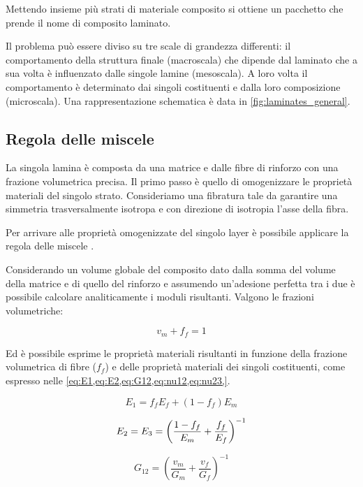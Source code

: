 \documentclass[a4paper,num-refs]{oup-contemporary}
\begin{document}
Mettendo insieme più strati di materiale composito si ottiene un pacchetto che prende il nome di composito laminato.

Il problema può essere diviso su tre scale di grandezza differenti: il comportamento della struttura finale (macroscala) che dipende dal laminato che a sua volta è influenzato dalle singole lamine (mesoscala). A loro volta il comportamento è determinato dai singoli costituenti e dalla loro composizione (microscala). Una rappresentazione schematica è data in \cref{fig:laminates_general}.


\subsection{Regola delle miscele}

La singola lamina è composta da una matrice e dalle fibre di rinforzo con una frazione volumetrica precisa. Il primo passo è quello di omogenizzare le proprietà materiali del singolo strato. Consideriamo una fibratura tale da garantire una simmetria trasversalmente isotropa e con direzione di isotropia l'asse della fibra. 

Per arrivare alle proprietà omogenizzate del singolo layer è possibile applicare la regola delle miscele \citep{Kollar:1}.

Considerando un volume globale del composito dato dalla somma del volume della matrice e di quello del rinforzo e assumendo un'adesione perfetta tra i due è possibile calcolare analiticamente i moduli risultanti. Valgono le frazioni volumetriche:

\begin{equation}
v_m+f_f=1   
\end{equation}

Ed è possibile esprime le proprietà materiali risultanti in funzione della frazione volumetrica di fibre ($f_f$) e delle proprietà materiali dei singoli costituenti, come espresso nelle \cref{eq:E1,eq:E2,eq:G12,eq:nu12,eq:nu23,}. 

\begin{equation}
E_1=f_f E_f+\left(1-f_f\right)E_m
\label{eq:E1}
\end{equation}

\begin{equation}
{E_2}=E_3=\left({1-f_f\over E_m}+{f_f\over E_f}\right)^{-1}
\label{eq:E2}
\end{equation}

\begin{equation}
G_{12}=\left(\frac{v_{m}}{G_{m}}+\frac{v_{f}}{G_{f}}\right)^{-1}
\label{eq:G12}
\end{equation}
\end{document}
